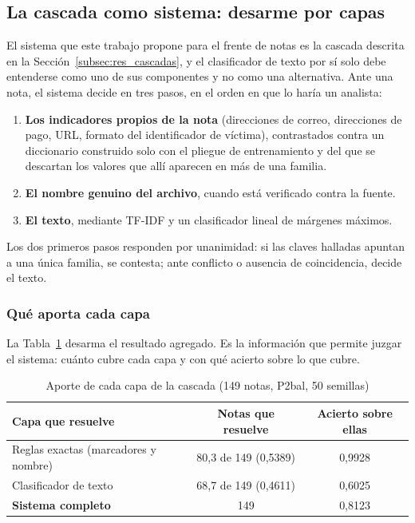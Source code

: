 \subsection{La cascada como sistema: desarme por capas}
\label{subsec:res_cascada_sistema}

El sistema que este trabajo propone para el frente de notas es la cascada descrita en la Sección~\ref{subsec:res_cascadas}, y el clasificador de texto por sí solo debe entenderse como uno de sus componentes y no como una alternativa. Ante una nota, el sistema decide en tres pasos, en el orden en que lo haría un analista:

\begin{enumerate}
  \item \textbf{Los indicadores propios de la nota} (direcciones de correo, direcciones de pago, URL, formato del identificador de víctima), contrastados contra un diccionario construido solo con el pliegue de entrenamiento y del que se descartan los valores que allí aparecen en más de una familia.
  \item \textbf{El nombre genuino del archivo}, cuando está verificado contra la fuente.
  \item \textbf{El texto}, mediante TF-IDF y un clasificador lineal de márgenes máximos.
\end{enumerate}

Los dos primeros pasos responden por unanimidad: si las claves halladas apuntan a una única familia, se contesta; ante conflicto o ausencia de coincidencia, decide el texto.

\subsubsection*{Qué aporta cada capa}

La Tabla~\ref{tab:capas} desarma el resultado agregado. Es la información que permite juzgar el sistema: cuánto cubre cada capa y con qué acierto sobre lo que cubre.

\begin{table}[ht]
\centering
\caption{Aporte de cada capa de la cascada (149 notas, P2bal, 50 semillas)}
\label{tab:capas}
\begin{tabular}{|l|c|c|}
\hline
\textbf{Capa que resuelve} & \textbf{Notas que resuelve} & \textbf{Acierto sobre ellas} \\
\hline
Reglas exactas (marcadores y nombre) & 80,3 de 149 \quad (0,5389) & 0,9928 \\
Clasificador de texto & 68,7 de 149 \quad (0,4611) & 0,6025 \\
\hline
\textbf{Sistema completo} & 149 & 0,8123 \\
\hline
\end{tabular}
\end{table}

